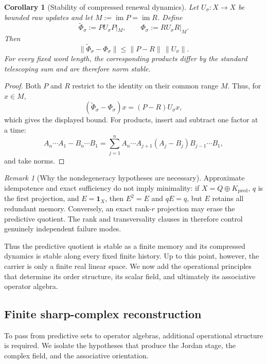 \documentclass[11pt]{article}
\newtheorem{corollary}[theorem]{Corollary}
\theoremstyle{definition}
\theoremstyle{remark}
\newtheorem{remark}[theorem]{Remark}
\newcommand{\one}{\mathbf 1}
\newcommand{\norm}[1]{\lVert#1\rVert}
\newcommand{\pred}{\mathrm{pred}}
\begin{document}
\begin{corollary}[Stability of compressed renewal dynamics]
\label{cor:compressed-dynamics-stability}
Let \(U_\sigma:X\to X\) be bounded raw updates and let
\(M:=\operatorname{im}P=\operatorname{im}R\).  Define
\[
 \widetilde\Phi_\sigma:=PU_\sigma P|_M,\qquad
 \Phi_\sigma:=RU_\sigma R|_M.
\]
Then
\[
 \boxed{
 \norm{\widetilde\Phi_\sigma-\Phi_\sigma}
 \le\norm{P-R}\,\norm{U_\sigma}.}
\]
For every fixed word length, the corresponding products differ by the
standard telescoping sum and are therefore norm stable.
\end{corollary}

\begin{proof}
Both \(P\) and \(R\) restrict to the identity on their common range \(M\).
Thus, for \(x\in M\),
\[
 (\widetilde\Phi_\sigma-\Phi_\sigma)x
 =(P-R)U_\sigma x,
\]
which gives the displayed bound.  For products, insert and subtract one
factor at a time:
\[
 A_n\cdots A_1-B_n\cdots B_1
 =
 \sum_{j=1}^n
 A_n\cdots A_{j+1}(A_j-B_j)B_{j-1}\cdots B_1,
\]
and take norms.
\end{proof}

\begin{remark}[Why the nondegeneracy hypotheses are necessary]
\label{rem:predictive-stability-boundaries}
Approximate idempotence and exact sufficiency do not imply minimality:
if \(X=Q\oplus K_{\pred}\), \(q\) is the first projection, and \(E=\one_X\),
then \(E^2=E\) and \(qE=q\), but \(E\) retains all redundant memory.
Conversely, an exact rank-\(r\) projection may erase the predictive quotient.
The rank and transversality clauses in
 therefore control genuinely
independent failure modes.
\end{remark}

Thus the predictive quotient is stable as a finite memory and its compressed
dynamics is stable along every fixed finite history.  Up to this point, however,
the carrier is only a finite real linear space.  We now add the operational
principles that determine its order structure, its scalar field, and ultimately
its associative operator algebra.

\subsection{Finite sharp-complex reconstruction}

To pass from predictive sets to operator algebras, additional operational
structure is required.  We isolate the hypotheses that produce the Jordan
stage, the complex field, and the associative orientation.
\end{document}
